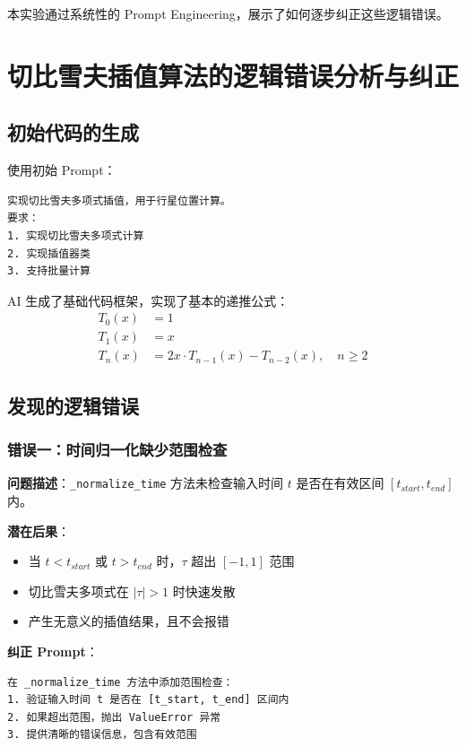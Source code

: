 \documentclass[12pt,a4paper]{article}
\begin{document}
本实验通过系统性的 Prompt Engineering，展示了如何逐步纠正这些逻辑错误。

\section{切比雪夫插值算法的逻辑错误分析与纠正}

\subsection{初始代码的生成}

使用初始 Prompt：
\begin{lstlisting}[caption={初始 Prompt}]
实现切比雪夫多项式插值，用于行星位置计算。
要求：
1. 实现切比雪夫多项式计算
2. 实现插值器类
3. 支持批量计算
\end{lstlisting}

AI 生成了基础代码框架，实现了基本的递推公式：
\begin{align}
    T_0(x) &= 1 \\
    T_1(x) &= x \\
    T_n(x) &= 2x \cdot T_{n-1}(x) - T_{n-2}(x), \quad n \geq 2
\end{align}

\subsection{发现的逻辑错误}

\subsubsection{错误一：时间归一化缺少范围检查}

\textbf{问题描述}：\texttt{\_normalize\_time} 方法未检查输入时间 $t$ 是否在有效区间 $[t_{start}, t_{end}]$ 内。

\textbf{潜在后果}：
\begin{itemize}
    \item 当 $t < t_{start}$ 或 $t > t_{end}$ 时，$\tau$ 超出 $[-1, 1]$ 范围
    \item 切比雪夫多项式在 $|\tau| > 1$ 时快速发散
    \item 产生无意义的插值结果，且不会报错
\end{itemize}

\textbf{纠正 Prompt}：
\begin{lstlisting}[caption={纠正范围检查的 Prompt}]
在 _normalize_time 方法中添加范围检查：
1. 验证输入时间 t 是否在 [t_start, t_end] 区间内
2. 如果超出范围，抛出 ValueError 异常
3. 提供清晰的错误信息，包含有效范围
\end{lstlisting}
\end{document}
